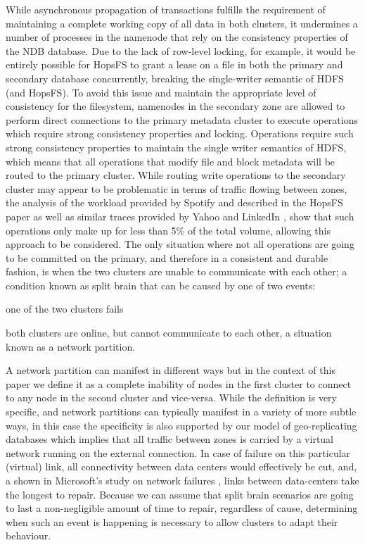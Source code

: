 While asynchronous propagation of transactions fulfills the requirement of maintaining a complete working copy of all data in both clusters, it undermines a number of processes in the namenode that rely on the consistency properties of the NDB database.
Due to the lack of row-level locking, for example, it would be entirely possible for HopsFS to grant a lease on a file in both the primary and secondary database concurrently, breaking the single-writer semantic of HDFS (and HopsFS).
To avoid this issue and maintain the appropriate level of consistency for the filesystem, namenodes in the secondary zone are allowed to perform direct connections to the primary metadata cluster to execute operations which require strong consistency properties and locking.
Operations require such strong consistency properties to maintain the single writer semantics of HDFS, which means that all operations that modify file and block metadata will be routed to the primary cluster.
While routing write operations to the secondary cluster may appear to be problematic in terms of traffic flowing between zones, the analysis of the workload provided by Spotify and described in the HopsFS paper \cite{DBLP:conf/dais/NiaziIBD15} as well as similar traces provided by Yahoo \cite{abad2014big} and LinkedIn \cite{DBLP:conf/sc/RenZPG14}, show that such operations only make up for less than 5\% of the total volume, allowing this approach to be considered.
The only situation where not all operations are going to be committed on the primary, and therefore in a consistent and durable fashion, is when the two clusters are unable to communicate with each other; a condition known as split brain that can be caused by one of two events:
\begin{inparaenum}[1)]
    \item one of the two clusters fails
    \item both clusters are online, but cannot communicate to each other, a situation known as a network partition.
\end{inparaenum}
A network partition can manifest in different ways but in the context of this paper we define it as a complete inability of nodes in the first cluster to connect to any node in the second cluster and vice-versa.
While the definition is very specific, and network partitions can typically manifest in a variety of more subtle ways, in this case the specificity is also supported by our model of geo-replicating databases which implies that all traffic between zones is carried by a virtual network running on the external connection.
In case of failure on this particular (virtual) link, all connectivity between data centers would effectively be cut, and, a shown in Microsoft's study on network failures \cite{DBLP:conf/sigcomm/GillJN11}, links between data-centers take the longest to repair.
Because we can assume that split brain scenarios are going to last a non-negligible amount of time to repair, regardless of cause, determining when such an event is happening is necessary to allow clusters to adapt their behaviour.

